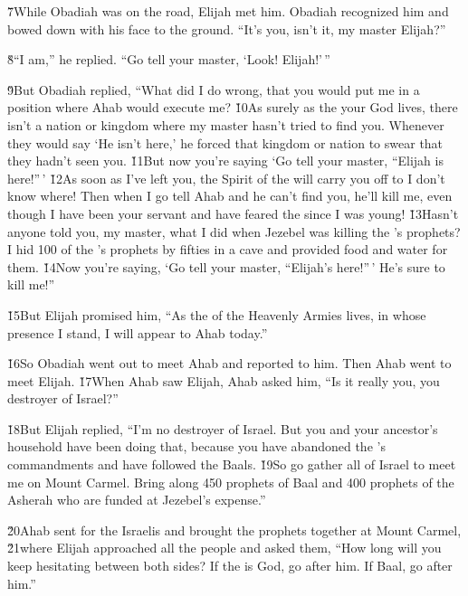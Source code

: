 \v{7}While Obadiah was on the road, Elijah met him. Obadiah recognized him and bowed down with his face to the ground. ``It's you, isn't it, my master Elijah?''

\v{8}``I am,'' he replied. ``Go tell your master, `Look! Elijah!'\,''

\v{9}But Obadiah replied, ``What did I do wrong, that you would put me in a position where Ahab would execute me? \v{10}As surely as the  your God lives, there isn't a nation or kingdom where my master hasn't tried to find you. Whenever they would say `He isn't here,' he forced that kingdom or nation to swear that they hadn't seen you. \v{11}But now you're saying `Go tell your master, ``Elijah is here!''\,' \v{12}As soon as I've left you, the Spirit of the  will carry you off to I don't know where! Then when I go tell Ahab and he can't find you, he'll kill me, even though I have been your servant and have feared the  since I was young! \v{13}Hasn't anyone told you, my master, what I did when Jezebel was killing the 's prophets? I hid 100 of the 's prophets by fifties in a cave and provided food and water for them. \v{14}Now you're saying, `Go tell your master, ``Elijah's here!''\,' He's sure to kill me!''

\v{15}But Elijah promised him, ``As the  of the Heavenly Armies lives, in whose presence I stand, I will appear to Ahab today.''

\v{16}So Obadiah went out to meet Ahab and reported to him. Then Ahab went to meet Elijah. \v{17}When Ahab saw Elijah, Ahab asked him, ``Is it really you, you destroyer of Israel?''

\v{18}But Elijah replied, ``I'm no destroyer of Israel. But you and your ancestor's household have been doing that, because you have abandoned the 's commandments and have followed the Baals. \v{19}So go gather all of Israel to meet me on Mount Carmel. Bring along 450 prophets of Baal and 400 prophets of the Asherah who are funded at Jezebel's expense.''

\v{20}Ahab sent for the Israelis and brought the prophets together at Mount Carmel, \v{21}where Elijah approached all the people and asked them, ``How long will you keep hesitating between both sides? If the  is God, go after him. If Baal, go after him.''

